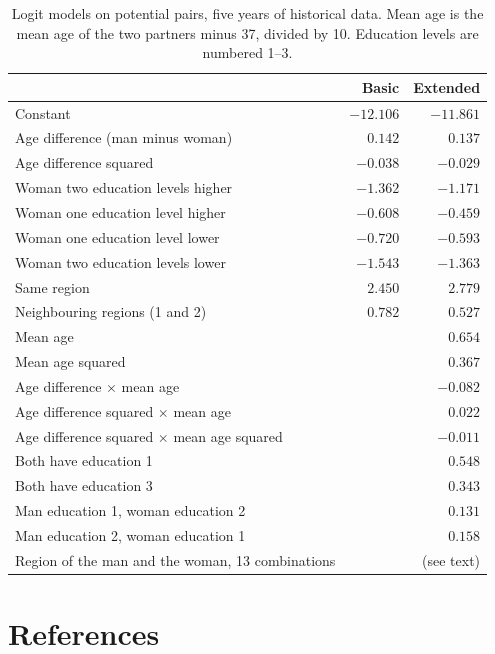 \documentclass[12pt,a4paper]{article}
\begin{document}
\begin{table}[H]
\centering
\caption{Logit models on potential pairs, five years of historical data. Mean age is the mean
age of the two partners minus 37, divided by 10. Education levels are numbered 1--3.}
\label{tab:logit}
\small
\begin{tabular}{@{}l rr@{}}
\toprule
 & Basic & Extended \\
\midrule
Constant & $-12.106$ & $-11.861$ \\
Age difference (man minus woman) & $0.142$ & $0.137$ \\
Age difference squared & $-0.038$ & $-0.029$ \\
Woman two education levels higher & $-1.362$ & $-1.171$ \\
Woman one education level higher & $-0.608$ & $-0.459$ \\
Woman one education level lower & $-0.720$ & $-0.593$ \\
Woman two education levels lower & $-1.543$ & $-1.363$ \\
Same region & $2.450$ & $2.779$ \\
Neighbouring regions (1 and 2) & $0.782$ & $0.527$ \\
Mean age & & $0.654$ \\
Mean age squared & & $0.367$ \\
Age difference $\times$ mean age & & $-0.082$ \\
Age difference squared $\times$ mean age & & $0.022$ \\
Age difference squared $\times$ mean age squared & & $-0.011$ \\
Both have education 1 & & $0.548$ \\
Both have education 3 & & $0.343$ \\
Man education 1, woman education 2 & & $0.131$ \\
Man education 2, woman education 1 & & $0.158$ \\
Region of the man and the woman, 13 combinations & & (see text) \\
\bottomrule
\end{tabular}
\end{table}

\section*{References}
\end{document}
